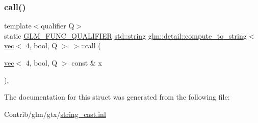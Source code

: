 \subsubsection{\texorpdfstring{call()}{call()}}
{\footnotesize\ttfamily template$<$qualifier Q$>$ \\
static \mbox{\hyperlink{setup_8hpp_a33fdea6f91c5f834105f7415e2a64407}{G\+L\+M\+\_\+\+F\+U\+N\+C\+\_\+\+Q\+U\+A\+L\+I\+F\+I\+ER}} \mbox{\hyperlink{_s_d_l__opengl__glext_8h_ae84541b4f3d8e1ea24ec0f466a8c568b}{std\+::string}} \mbox{\hyperlink{structglm_1_1detail_1_1compute__to__string}{glm\+::detail\+::compute\+\_\+to\+\_\+string}}$<$ \mbox{\hyperlink{structglm_1_1vec}{vec}}$<$ 4, bool, Q $>$ $>$\+::call (\begin{DoxyParamCaption}\item[{\mbox{\hyperlink{structglm_1_1vec}{vec}}$<$ 4, bool, Q $>$ const \&}]{x }\end{DoxyParamCaption})\hspace{0.3cm}{\ttfamily [inline]}, {\ttfamily [static]}}



The documentation for this struct was generated from the following file\+:\begin{DoxyCompactItemize}
\item 
Contrib/glm/gtx/\mbox{\hyperlink{string__cast_8inl}{string\+\_\+cast.\+inl}}\end{DoxyCompactItemize}
